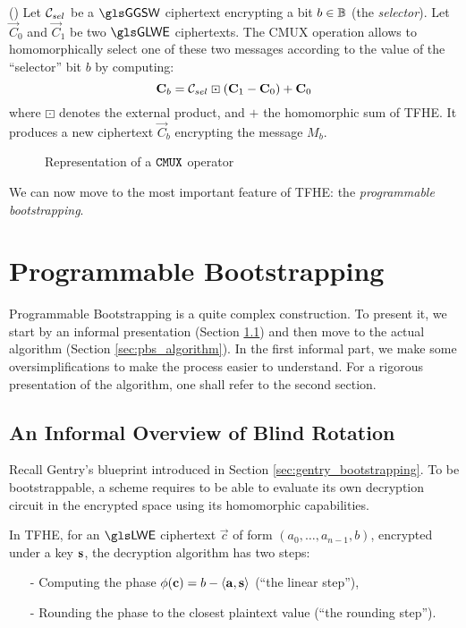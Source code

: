 \begin{definition}(\CMUX)
	\label{def:cmux}
	Let $\mathcal C_{sel}$ be a $\GGSW$ ciphertext encrypting a bit $b \in \mathbb{B}$ (the \textit{selector}). Let $\vec C_0$ and $\vec C_1$ be two $\GLWE$ ciphertexts. The CMUX operation allows to homomorphically select one of these two messages according to the value of the ``selector'' bit $b$ by computing:
	\begin{equation*}
		\mathbf C_b = \mathcal C_{sel} \boxdot (\mathbf C_1 - \mathbf C_0) + \mathbf C_0
	\end{equation*}
	where $\boxdot$ denotes the external product, and $+$ the homomorphic sum of \gls{TFHE}. It produces a new ciphertext $\vec C_b$ encrypting the message $M_b$.
\end{definition}


\begin{figure}
	\centering
	\singleCmux
	\caption{Representation of a $\texttt{CMUX}$ operator}
	\label{fig:cmux}
\end{figure}


We can now move to the most important feature of \gls{TFHE}: the \textit{programmable bootstrapping}.

\section{Programmable Bootstrapping}
\label{sec:pbs}

Programmable Bootstrapping is a quite complex construction. To present it, we start by an informal presentation (Section \ref{sec:overview_blind_rotation}) and then move to the actual algorithm (Section \ref{sec:pbs_algorithm}). In the first informal part, we make some oversimplifications to make the process easier to understand. For a rigorous presentation of the algorithm, one shall refer to the second section.

\subsection{An Informal Overview of Blind Rotation}
\label{sec:overview_blind_rotation}

Recall Gentry's blueprint introduced in Section \ref{sec:gentry_bootstrapping}. To be bootstrappable, a scheme requires to be able to evaluate its own decryption circuit in the encrypted space using its homomorphic capabilities.

In \gls{TFHE}, for an $\LWE$ ciphertext $\vec c$ of form $(a_0, \dots, a_{n-1}, b)$, encrypted under a key $\mathbf s$, the decryption algorithm has two steps:
\begin{itemize}
	\item[-] Computing the phase $\phi(\mathbf c) = b - \left \langle \mathbf a, \mathbf s \right \rangle$ (``the linear step''),
	\item[-] Rounding the phase to the closest plaintext value (``the rounding step'').
\end{itemize}

